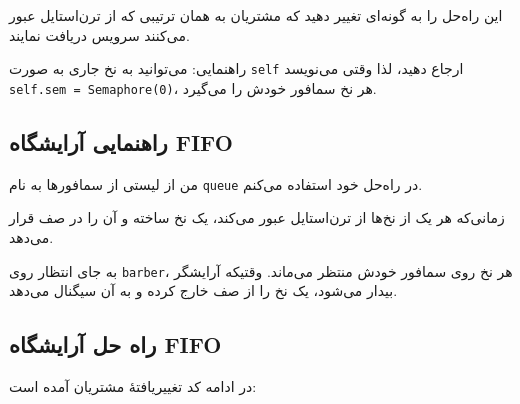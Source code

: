 \documentclass{book}
\newcommand{\clearemptydoublepage}{\newpage\cleardoublepage}
\begin{document}
	این راه‌حل را به گونه‌ای تغییر دهید که مشتریان به همان ترتیبی که از ترن‌استایل عبور می‌کنند سرویس دریافت نمایند.
  
	راهنمایی: می‌توانید به نخ جاری به صورت {\tt self} ارجاع دهید، 
	لذا وقتی می‌نویسد {\tt self.sem = Semaphore(0)}، هر نخ سمافور خودش را می‌گیرد.


\clearemptydoublepage
\subsection{راهنمایی آرایشگاه FIFO}

	من از لیستی از سمافورها به نام {\tt queue} در راه‌حل خود استفاده می‌کنم.

\begin{latin}
%

\end{latin}

	زمانی‌که هر یک از نخ‌ها از ترن‌استایل عبور می‌کند، یک نخ ساخته و آن را در صف قرار می‌دهد.

	به جای انتظار روی {\tt barber}، هر نخ روی سمافور خودش منتظر می‌ماند. 
	وقتیکه آرایشگر بیدار می‌شود، یک نخ را از صف خارج کرده و به آن سیگنال می‌دهد.


\clearemptydoublepage
\subsection{راه حل آرایشگاه FIFO}

	در ادامه کد تغییریافتهٔ مشتریان آمده است:
\end{document}
